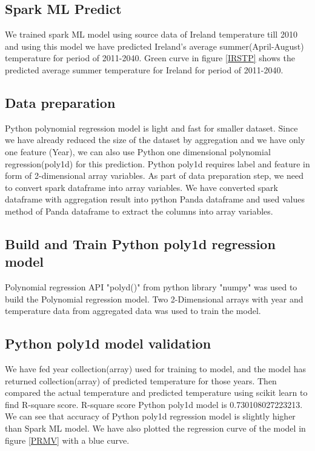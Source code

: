 \documentclass[journal,twoside,web]{ieeecolor}
\begin{document}
\subsection{Spark ML Predict}
We trained spark ML model using source data of Ireland temperature till 2010 and using this model we have predicted Ireland's average summer(April-August) temperature for period of 2011-2040.  Green curve in figure \ref{IRSTP} shows the predicted average summer temperature for Ireland for period of 2011-2040.

\subsection{Data preparation}
Python polynomial regression model is light and fast for smaller dataset.  Since we have already reduced the size of the dataset by aggregation and we have only one feature (Year), we can also use Python one dimensional polynomial regression(poly1d) for this prediction.  Python poly1d requires label and feature in form of 2-dimensional array variables.  As part of data preparation step, we need to convert spark dataframe into array variables.  We have converted spark dataframe with aggregation result into python Panda dataframe and used values method of Panda dataframe to extract the columns into array variables. 

\subsection{Build and Train Python poly1d regression model}
Polynomial regression API "polyd()" from python library "numpy" was used to build the Polynomial regression model. Two 2-Dimensional arrays with year and temperature data from aggregated data was used to train the model.

\subsection{Python poly1d model validation}
We have fed year collection(array) used for training to model, and the model has returned collection(array) of predicted temperature for those years.  Then compared the actual temperature and predicted temperature using scikit learn to find R-square score.  R-square score Python poly1d model is 0.730108027223213.  We can see that accuracy of Python poly1d regression model is slightly higher than Spark ML model.  We have also plotted the regression curve of the model in figure \ref{PRMV} with a blue curve. 
\end{document}
